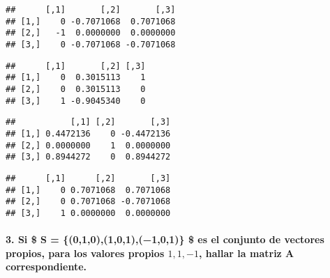 \documentclass[]{article}
\newenvironment{Shaded}{\begin{snugshade}}{\end{snugshade}}
\newcommand{\CommentTok}[1]{\textcolor[rgb]{0.56,0.35,0.01}{\textit{#1}}}
\newcommand{\KeywordTok}[1]{\textcolor[rgb]{0.13,0.29,0.53}{\textbf{#1}}}
\newcommand{\NormalTok}[1]{#1}
\newcommand{\OperatorTok}[1]{\textcolor[rgb]{0.81,0.36,0.00}{\textbf{#1}}}
\let\oldparagraph\paragraph
\renewcommand{\paragraph}[1]{\oldparagraph{#1}\mbox{}}
\begin{document}
\begin{Shaded}
\end{Shaded}

\begin{verbatim}
##      [,1]       [,2]       [,3]
## [1,]    0 -0.7071068  0.7071068
## [2,]   -1  0.0000000  0.0000000
## [3,]    0 -0.7071068 -0.7071068
\end{verbatim}

\begin{Shaded}
\end{Shaded}

\begin{verbatim}
##      [,1]       [,2] [,3]
## [1,]    0  0.3015113    1
## [2,]    0  0.3015113    0
## [3,]    1 -0.9045340    0
\end{verbatim}

\begin{Shaded}
\end{Shaded}

\begin{verbatim}
##           [,1] [,2]       [,3]
## [1,] 0.4472136    0 -0.4472136
## [2,] 0.0000000    1  0.0000000
## [3,] 0.8944272    0  0.8944272
\end{verbatim}

\begin{Shaded}
\end{Shaded}

\begin{verbatim}
##      [,1]      [,2]       [,3]
## [1,]    0 0.7071068  0.7071068
## [2,]    0 0.7071068 -0.7071068
## [3,]    1 0.0000000  0.0000000
\end{verbatim}

\hypertarget{si-s-010101101-es-el-conjunto-de-vectores-propios-para-los-valores-propios-111-hallar-la-matriz-a-correspondiente.}{%
\paragraph{\texorpdfstring{3. Si \$ S = \{(0,1,0),(1,0,1),(−1,0,1)\} \$
es el conjunto de vectores propios, para los valores propios \(1,1,−1\),
hallar la matriz A
correspondiente.}{3. Si \$ S = \{(0,1,0),(1,0,1),(−1,0,1)\} \$ es el conjunto de vectores propios, para los valores propios 1,1,−1, hallar la matriz A correspondiente.}}\label{si-s-010101101-es-el-conjunto-de-vectores-propios-para-los-valores-propios-111-hallar-la-matriz-a-correspondiente.}}
\end{document}
